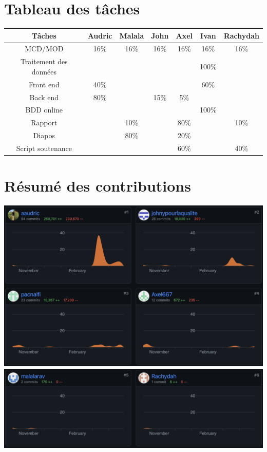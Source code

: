 \documentclass[12pt,a4paper]{report}
\begin{document}
\section{Tableau des tâches}
\begin{tabular}{|c|c|c|c|c|c|c|}
\hline
Tâches & Audric & Malala & John & Axel & Ivan & Rachydah \\
\hline
MCD/MOD & 16\% & 16\% & 16\% & 16\% & 16\% & 16\%\\
\hline
Traitement des données & & & & & 100\% & \\
\hline
Front end & 40\% & & & & 60\% & \\
\hline
Back end & 80\% & & 15\% & 5\% & &\\
\hline
BDD online & & & & & 100\% & \\
\hline
Rapport & & 10\% & & 80\% & & 10\% \\
\hline
Diapos & & 80\% & & 20\% & & \\
\hline
Script soutenance & & & & 60\% & & 40\% \\
\hline
\end{tabular}

\section{Résumé des contributions}
 \begin{center}
        \includegraphics[width=1\textwidth]{images/contribution1.png}
        \includegraphics[width=1\textwidth]{images/contribution2.png}
\end{center}
\end{document}
